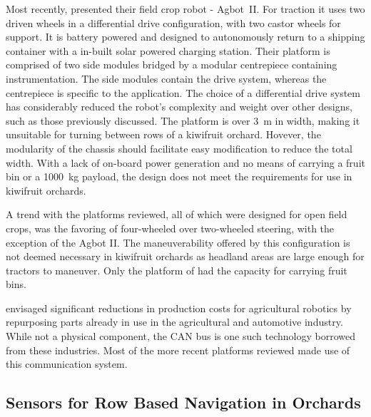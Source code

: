 \documentclass[preprint,authoryear,12pt]{elsarticle}
\begin{document}
        Most recently, \cite{Bawden2017} presented their field crop robot - Agbot~II.
        For traction it uses two driven wheels in a differential drive configuration, with two castor wheels for support.
        It is battery powered and designed to autonomously return to a shipping container with a in-built solar powered charging station.
        Their platform is comprised of two side modules bridged by a modular centrepiece containing instrumentation.
        The side modules contain the drive system, whereas the centrepiece is specific to the application.
        The choice of a differential drive system has considerably reduced the robot's complexity and weight over other designs, such as those previously discussed.
        The platform is over \SI{3}{\meter} in width, making it unsuitable for turning between rows of a kiwifruit orchard.
        Hovever, the modularity of the chassis should facilitate easy modification to reduce the total width.
        With a lack of on-board power generation and no means of carrying a fruit bin or a \SI{1000}{\kilo\gram} payload, the design does not meet the requirements for use in kiwifruit orchards.

        A trend with the platforms reviewed, all of which were designed for open field crops, was the favoring of four-wheeled over two-wheeled steering, with the exception of the Agbot II.
        The maneuverability offered by this configuration is not deemed necessary in kiwifruit orchards as headland areas are large enough for tractors to maneuver.
        Only the platform of \cite{Scarfe2012} had the capacity for carrying fruit bins.


        \cite{Blackmore2007} envisaged significant reductions in production costs for agricultural robotics by repurposing parts already in use in the agricultural and automotive industry.
        While not a physical component, the CAN bus is one such technology borrowed from these industries.
        Most of the more recent platforms reviewed made use of this communication system.

    \subsection{Sensors for Row Based Navigation in Orchards}
\end{document}
